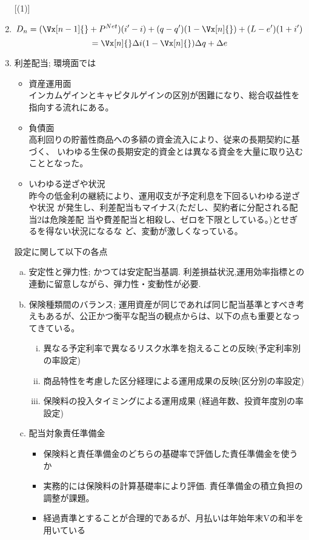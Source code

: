 \documentclass[report,gutter=10mm,fore-edge=10mm,uplatex,dvipdfmx]{jlreq}
\begin{document}
\begin{enumerate} [(1)]
 \item $$ D_n = (\Vx[n-1]{} + P^{Net})(i'-i)+(q-q')(1-\Vx[n]{})+(L-e')(1+i')$$
$$ = \Vx[n]{}\Delta i  (1-\Vx[n]{})\Delta q + \Delta e$$
 \item 利差配当; 環境面では
\begin{itemize}
 \item 資産運用面\\
インカムゲインとキャピタルゲインの区別が困難になり、総合収益性を指向する流れにある。
 \item 負債面\\
高利回りの貯蓄性商品への多額の資金流入により、従来の長期契約に基づく、
いわゆる生保の長期安定的資金とは異なる資金を大量に取り込むこととなった。
 \item いわゆる逆ざや状況\\
昨今の低金利の継続により、運用収支が予定利息を下回るいわゆる逆ざや状況
が発生し、利差配当もマイナス(ただし、契約者に分配される配当2は危険差配
当や費差配当と相殺し、ゼロを下限としている。)とせぎるを得ない状況になるな
ど、変動が激しくなっている。
\end{itemize}
設定に関して以下の各点
\begin{enumerate} [(a)]
 \item 安定性と弾力性; かつては安定配当基調.   利差損益状況,運用効率指標との連動に留意しながら、弾力性・変動性が必要.
 \item 保険種類間のバランス; 運用資産が同じであれば同じ配当基準とすべき考えもあるが、公正かつ衡平な配当の観点からは、以下の点も重要となってきている。
\begin{enumerate} [(i)]
 \item 異なる予定利率で異なるリスク水準を抱えることの反映(予定利率別の率設定)
 \item 商品特性を考慮した区分経理による運用成果の反映(区分別の率設定)
 \item 保険料の投入タイミングによる運用成果 (経過年数、投資年度別の率設定)
\end{enumerate}
 \item 配当対象責任準備金
\begin{itemize}
 \item 保険料と責任準備金のどちらの基礎率で評価した責任準備金を使うか
 \item  実務的には保険料の計算基礎率により評価. 責任準備金の積立負担の調整が課題。
 \item   経過責準とすることが合理的であるが、月払いは年始年末Vの和半を用いている
\end{itemize}

\end{enumerate}
\end{enumerate}
\end{document}
